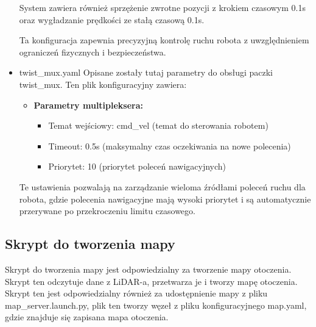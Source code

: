 \documentclass[a4paper,twoside,12pt]{book}
\begin{document}
\begin{itemize}
	System zawiera również sprzężenie zwrotne pozycji z krokiem czasowym 0.1s oraz wygładzanie prędkości ze stałą czasową 0.1s.

	Ta konfiguracja zapewnia precyzyjną kontrolę ruchu robota z uwzględnieniem ograniczeń fizycznych i bezpieczeństwa.
	\newpage
	\item twist\_mux.yaml
	Opisane zostały tutaj parametry do obsługi paczki twist\_mux. Ten plik konfiguracyjny zawiera:
	\begin{itemize}
	\item \textbf{Parametry multipleksera:}
		\begin{itemize}
		\item Temat wejściowy: cmd\_vel (temat do sterowania robotem)
		\item Timeout: 0.5s (maksymalny czas oczekiwania na nowe polecenia)
		\item Priorytet: 10 (priorytet poleceń nawigacyjnych)
		\end{itemize}
	\end{itemize}

	Te ustawienia pozwalają na zarządzanie wieloma źródłami poleceń ruchu dla robota, gdzie polecenia nawigacyjne mają wysoki priorytet i są automatycznie przerywane po przekroczeniu limitu czasowego.
\end{itemize}


\newpage
\subsection{Skrypt do tworzenia mapy}
Skrypt do tworzenia mapy jest odpowiedzialny za tworzenie mapy otoczenia. Skrypt ten odczytuje dane z LiDAR-a, przetwarza je i tworzy mapę otoczenia. Skrypt ten jest odpowiedzialny również za udostępnienie mapy z pliku map\_server.launch.py, plik ten tworzy węzeł z pliku konfiguracyjnego map.yaml, gdzie znajduje się zapisana mapa otoczenia.
\end{document}
